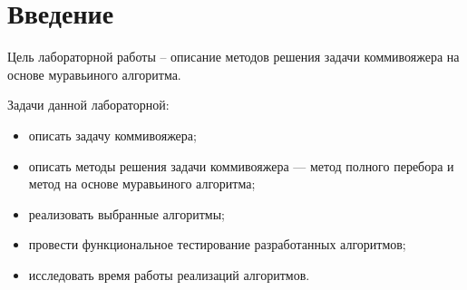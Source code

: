 \chapter*{Введение}

Цель лабораторной работы -- описание методов решения задачи коммивояжера на основе муравьиного алгоритма.

Задачи данной лабораторной:
\begin{itemize}
	\item описать задачу коммивояжера;
	\item описать методы решения задачи коммивояжера --- метод полного перебора и метод на основе муравьиного алгоритма;
	\item реализовать выбранные алгоритмы;
	\item провести функциональное тестирование разработанных алгоритмов;
	\item исследовать время работы реализаций алгоритмов.  
\end{itemize}